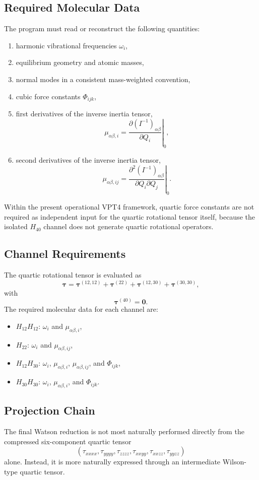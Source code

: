 \documentclass[11pt,a4paper]{article}
\begin{document}
\subsection{Required Molecular Data}
The program must read or reconstruct the following quantities:
\begin{enumerate}[leftmargin=*]
\item harmonic vibrational frequencies \(\omega_i\),
\item equilibrium geometry and atomic masses,
\item normal modes in a consistent mass-weighted convention,
\item cubic force constants \(\Phi_{ijk}\),
\item first derivatives of the inverse inertia tensor,
\[
\mu_{\alpha\beta,i}
=
\left.
\frac{\partial (I^{-1})_{\alpha\beta}}{\partial Q_i}
\right|_0,
\]
\item second derivatives of the inverse inertia tensor,
\[
\mu_{\alpha\beta,ij}
=
\left.
\frac{\partial^2 (I^{-1})_{\alpha\beta}}{\partial Q_i \partial Q_j}
\right|_0.
\]
\end{enumerate}

Within the present operational VPT4 framework, quartic force constants are not required as independent input for the quartic rotational tensor itself, because the isolated \(H_{40}\) channel does not generate quartic rotational operators.

\subsection{Channel Requirements}
The quartic rotational tensor is evaluated as
\[
\bm{\tau}
=
\bm{\tau}^{(12,12)}
+
\bm{\tau}^{(22)}
+
\bm{\tau}^{(12,30)}
+
\bm{\tau}^{(30,30)},
\]
with
\[
\bm{\tau}^{(40)} = \bm{0}.
\]
The required molecular data for each channel are:
\begin{itemize}[leftmargin=*]
\item \(H_{12}H_{12}\): \(\omega_i\) and \(\mu_{\alpha\beta,i}\),
\item \(H_{22}\): \(\omega_i\) and \(\mu_{\alpha\beta,ij}\),
\item \(H_{12}H_{30}\): \(\omega_i\), \(\mu_{\alpha\beta,i}\), \(\mu_{\alpha\beta,ij}\), and \(\Phi_{ijk}\),
\item \(H_{30}H_{30}\): \(\omega_i\), \(\mu_{\alpha\beta,i}\), and \(\Phi_{ijk}\).
\end{itemize}

\subsection{Projection Chain}
The final Watson reduction is not most naturally performed directly from the compressed six-component quartic tensor
\[
(\tau_{xxxx},\tau_{yyyy},\tau_{zzzz},\tau_{xxyy},\tau_{xxzz},\tau_{yyzz})
\]
alone. Instead, it is more naturally expressed through an intermediate Wilson-type quartic tensor.
\end{document}
